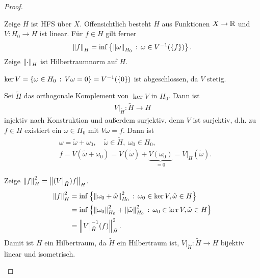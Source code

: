 \begin{proof}
\begin{proofenum}
\item
Zeige $H$ ist HFS über $X$. Offensichtlich besteht $H$ aus Funktionen $X\to \mathbb{R}$
und $V: H_0\to H$ ist linear. Für $f\in H$ gilt ferner
\begin{align*}
\left\|f\right\|_H = \inf\left\{ \left\|\omega\right\|_{H_0}\,:\,\omega\in V^{-1}(\left\{ f \right\})\right\}.
\end{align*}
Zeige $\left\|\cdot\right\|_H$ ist Hilbertraumnorm auf $H$.
\begin{proofenuma}
\item $\ker V = \left\{ \omega\in H_0\,:\,V\omega = 0\right\}=V^{-1}(\left\{ 0 \right\})$ ist
abgeschlossen, da $V$ stetig.
\item Sei $\tilde{H}$ das orthogonale Komplement von $\ker V$ in $H_0$. 
Dann ist
\begin{align*}
V\big|_{\tilde{H}} : \tilde{H}\to H
\end{align*}
injektiv nach Konstruktion und außerdem surjektiv, denn $V$ ist surjektiv, d.h.
zu $f\in H$ existiert ein $\omega\in H_0$ mit $V\omega = f$. Dann ist
\begin{align*}
&\omega = \tilde{\omega} + \omega_0,\quad
\tilde{\omega} \in \tilde{H},\; \omega_0\in H_0,\\
&f = V(\tilde{\omega}+\omega_0) = V(\tilde{\omega}) +
\underbrace{V(\omega_0)}_{=0} = V\big|_{\tilde{H}}(\tilde{\omega}).
\end{align*}
\item Zeige $\left\|f\right\|_H^2 = \left\|(V\big|_{\tilde{H}})f\right\|_H$.
\begin{align*}
\left\|f\right\|_H^2 &= \inf \left\{ \left\|\omega_0 +
\tilde{\omega}\right\|_{H_0}^2\,:\,\omega_0\in \ker V, \tilde{\omega}\in H\right\} \\ &
= \inf \left\{ \left\|\omega_0\right\|_{H_0}^2 + \left\|\tilde{\omega}\right\|_{H_0}^2\,:\,\omega_0\in \ker V, \tilde{\omega}\in H\right\}\\
&= \left\|V\big|_{\tilde{H}}^{-1}(f)\right\|_{\tilde{H}}^2.
\end{align*}
Damit ist $H$ ein Hilbertraum, da $\tilde{H}$ ein Hilbertraum ist,
$V\big|_{\tilde{H}}: \tilde{H}\to H$ bijektiv linear und isometrisch.


\end{proofenuma}
\end{proofenum}
\end{proof}
